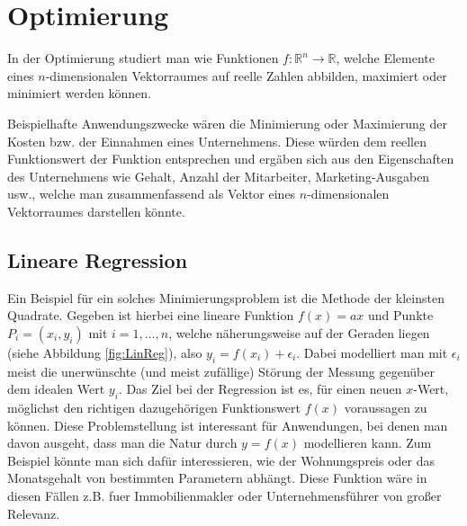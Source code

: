 \section{Optimierung}

In der Optimierung studiert man wie Funktionen $f: \mathbb{R}^n \rightarrow \mathbb{R}$, welche Elemente eines $n$-dimensionalen Vektorraumes auf reelle Zahlen abbilden, maximiert oder minimiert werden können.

Beispielhafte Anwendungszwecke wären die Minimierung oder Maximierung der Kosten bzw. der Einnahmen eines Unternehmens. Diese würden dem reellen Funktionswert der Funktion entsprechen und ergäben sich aus den Eigenschaften des Unternehmens wie Gehalt, Anzahl der Mitarbeiter, Marketing-Ausgaben usw., welche man zusammenfassend als Vektor eines $n$-dimensionalen Vektorraumes darstellen könnte.

\subsection{Lineare Regression}
\label{sec:regression}
Ein Beispiel für ein solches Minimierungsproblem ist die Methode der kleinsten Quadrate. Gegeben ist hierbei eine lineare Funktion $f(x) = ax$ und Punkte $P_i=(x_i,y_i)$ mit $i=1,\dots,n$, welche näherungsweise auf der Geraden liegen (siehe Abbildung \ref{fig:LinReg}), also $y_i = f(x_i) + \epsilon_{i}$. Dabei modelliert man mit $\epsilon_i$ meist die unerw\"unschte (und meist zuf\"allige) St\"orung der Messung gegen\"uber dem idealen Wert $y_i$. Das Ziel bei der Regression ist es, f\"ur einen neuen $x$-Wert, m\"oglichst den richtigen dazugeh\"origen Funktionswert $f(x)$ voraussagen zu k\"onnen. Diese Problemstellung ist interessant f\"ur Anwendungen, bei denen man davon ausgeht, dass man die Natur durch $y = f(x)$ modellieren kann. Zum Beispiel k\"onnte man sich daf\"ur interessieren, wie der Wohnungspreis oder das Monatsgehalt von bestimmten Parametern abh\"angt. Diese Funktion w\"are in diesen F\"allen z.B. fuer Immobilienmakler oder Unternehmensf\"uhrer von gro\ss er Relevanz. 


